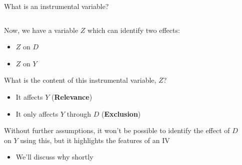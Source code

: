 \documentclass[notes,11pt, aspectratio=169]{beamer}
\newenvironment{wideitemize}{\itemize\addtolength{\itemsep}{10pt}}{\enditemize}
\begin{document}
\begin{frame}{What is an instrumental variable?}
  \begin{columns}[T] %
    \begin{column}{0.6\textwidth}
      \begin{wideitemize}
      \item Now, we have a variable $Z$ which can identify two effects:
        \begin{itemize}
        \item $Z$ on $D$
        \item $Z$ on $Y$
        \end{itemize}
      \item What is the content of this instrumental variable, $Z$?
        \begin{itemize}
        \item It  affects $Y$ (\textbf{Relevance})                    
        \item It only affects $Y$ through $D$ (\textbf{Exclusion})
        \end{itemize}
      \item Without further assumptions, it won't be possible to
        identify the effect of $D$ on $Y$ using this, but it
        highlights the features of an IV
        \begin{itemize}
        \item We'll discuss why shortly
        \end{itemize}
      \end{wideitemize}
\end{column}
\begin{column}{0.4\textwidth}
  \begin{center}
      \end{center}
\end{column}
\end{columns}
\end{frame}
\end{document}
